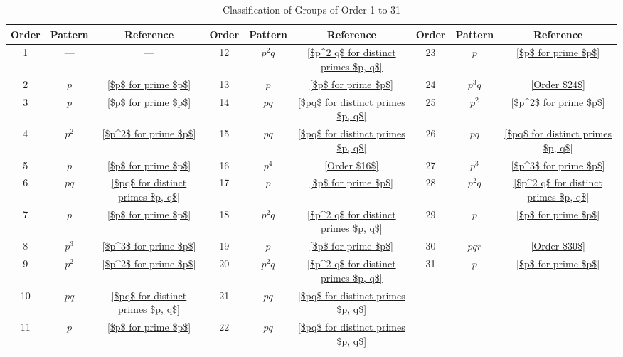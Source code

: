 \documentclass[a4paper,11pt, titlepage]{article}
\theoremstyle{remark}
\begin{document}
\begin{table}[htbp]
\centering
\caption{Classification of Groups of Order 1 to 31}
\label{tab:groups_1_31_clean}
\small
\begin{tabular}{ccc | ccc | ccc}
\hline
Order & Pattern & Reference & Order & Pattern & Reference & Order & Pattern & Reference \\
\hline
1  & —      & —                                      & 12 & $p^2 q$ & \ref{$p^2 q$ for distinct primes $p, q$} & 23 & $p$     & \ref{$p$ for prime $p$} \\
2  & $p$    & \ref{$p$ for prime $p$}                & 13 & $p$     & \ref{$p$ for prime $p$}                & 24 & $p^3 q$ & \ref{Order $24$} \\
3  & $p$    & \ref{$p$ for prime $p$}                & 14 & $pq$    & \ref{$pq$ for distinct primes $p, q$}  & 25 & $p^2$   & \ref{$p^2$ for prime $p$} \\
4  & $p^2$  & \ref{$p^2$ for prime $p$}              & 15 & $pq$    & \ref{$pq$ for distinct primes $p, q$}  & 26 & $pq$    & \ref{$pq$ for distinct primes $p, q$} \\
5  & $p$    & \ref{$p$ for prime $p$}                & 16 & $p^4$   & \ref{Order $16$}                       & 27 & $p^3$   & \ref{$p^3$ for prime $p$} \\
6  & $pq$   & \ref{$pq$ for distinct primes $p, q$}  & 17 & $p$     & \ref{$p$ for prime $p$}                & 28 & $p^2 q$ & \ref{$p^2 q$ for distinct primes $p, q$} \\
7  & $p$    & \ref{$p$ for prime $p$}                & 18 & $p^2 q$ & \ref{$p^2 q$ for distinct primes $p, q$} & 29 & $p$     & \ref{$p$ for prime $p$} \\
8  & $p^3$  & \ref{$p^3$ for prime $p$}              & 19 & $p$     & \ref{$p$ for prime $p$}                & 30 & $p q r$ & \ref{Order $30$} \\
9  & $p^2$  & \ref{$p^2$ for prime $p$}              & 20 & $p^2 q$ & \ref{$p^2 q$ for distinct primes $p, q$} & 31 & $p$     & \ref{$p$ for prime $p$} \\
10 & $pq$   & \ref{$pq$ for distinct primes $p, q$}  & 21 & $pq$    & \ref{$pq$ for distinct primes $p, q$}  &    &         & \\
11 & $p$    & \ref{$p$ for prime $p$}                & 22 & $pq$    & \ref{$pq$ for distinct primes $p, q$}  &    &         & \\
\hline
\end{tabular}
\end{table}
\end{document}
